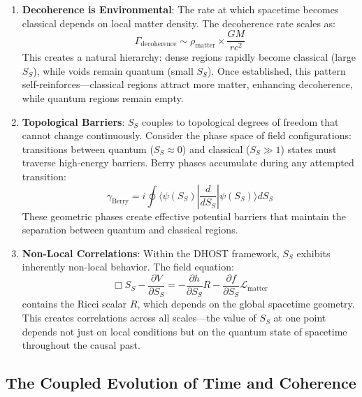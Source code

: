 \documentclass[12pt]{article}
\begin{document}
\begin{enumerate}
    \item \textbf{Decoherence is Environmental}: The rate at which spacetime becomes classical depends on local matter density. The decoherence rate scales as:
    \begin{equation}
        \Gamma_{\textrm{decoherence}} \sim \rho_\mathrm{matter} \times \frac{GM}{rc^2}
    \end{equation}
    This creates a natural hierarchy: dense regions rapidly become classical (large $S_S$), while voids remain quantum (small $S_S$). Once established, this pattern self-reinforces---classical regions attract more matter, enhancing decoherence, while quantum regions remain empty.
    
    \item \textbf{Topological Barriers}: $S_S$ couples to topological degrees of freedom that cannot change continuously. Consider the phase space of field configurations: transitions between quantum ($S_S \approx 0$) and classical ($S_S \gg 1$) states must traverse high-energy barriers. Berry phases accumulate during any attempted transition:
    \begin{equation}
        \gamma_\mathrm{Berry} = i \oint \langle \psi(S_S) | \frac{d}{dS_S} | \psi(S_S) \rangle dS_S
    \end{equation}
    These geometric phases create effective potential barriers that maintain the separation between quantum and classical regions.
    
    \item \textbf{Non-Local Correlations}: Within the DHOST framework, $S_S$ exhibits inherently non-local behavior. The field equation:
    \begin{equation}
        \Box S_S - \frac{\partial V}{\partial S_S} = -\frac{\partial h}{\partial S_S} R - \frac{\partial f}{\partial S_S} \mathcal{L}_\mathrm{matter}
    \end{equation}
    contains the Ricci scalar $R$, which depends on the global spacetime geometry. This creates correlations across all scales---the value of $S_S$ at one point depends not just on local conditions but on the quantum state of spacetime throughout the causal past.
\end{enumerate}

\subsection{The Coupled Evolution of Time and Coherence}
\end{document}
